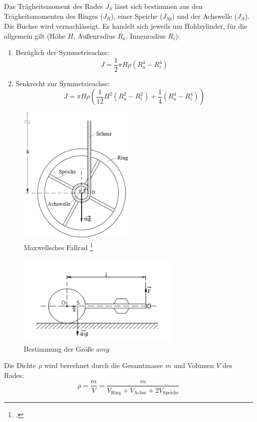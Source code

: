 Das Trägheitsmoment des Rades $J_S$ lässt sich bestimmen aus den Trägheitsmomenten des Ringes ($J_R$), einer Speiche ($J_{Sp}$) und der Achswelle ($J_A$). Die Buchse wird vernachlässigt. Es handelt sich jeweils um Hohlzylinder, für die allgemein gilt (Höhe $H$, Außenradius $R_a$, Innenradius $R_i$):
\begin{enumerate}
  \item Bezüglich der Symmetrieachse:
    \begin{equation}
      J=\frac{1}{2}\pi H\rho\left(R_a^4-R_i^4\right)
      \label{eq:traegheit_symmetrieachse}
    \end{equation}
  \item Senkrecht zur Symmetrieachse:
    \begin{equation}
      J=\pi H\rho \left(\frac{1}{12}H^2(R_a^2-R_i^2)+\frac{1}{4}(R_a^4-R_i^4)\right)
      \label{eq:traegheit_senkrecht}
    \end{equation}
\end{enumerate}
\begin{figure}[h]
  \centering
  \includegraphics[width=0.5\textwidth]{fallrad}
  \caption{Maxwellsches Fallrad \footcite{anleitung-ws2014}}
  \label{fig:fallrad}
\end{figure}
\begin{figure}[H] 
  \centering
	\includegraphics[width=0.7\textwidth]{abestimmung.png}
	\caption{Bestimmung der Größe $amg$}
  \label{fig:abestimmung}
\end{figure}
Die Dichte $\rho$ wird berechnet durch die Gesamtmasse $m$ und Volumen $V$ des Rades:
\begin{equation}
  \rho=\frac{m}{V}=\frac{m}{V_{\text{Ring}}+V_{\text{Achse}}+2V_{\text{Speiche}}}
  \label{eq:dichte}
\end{equation}
